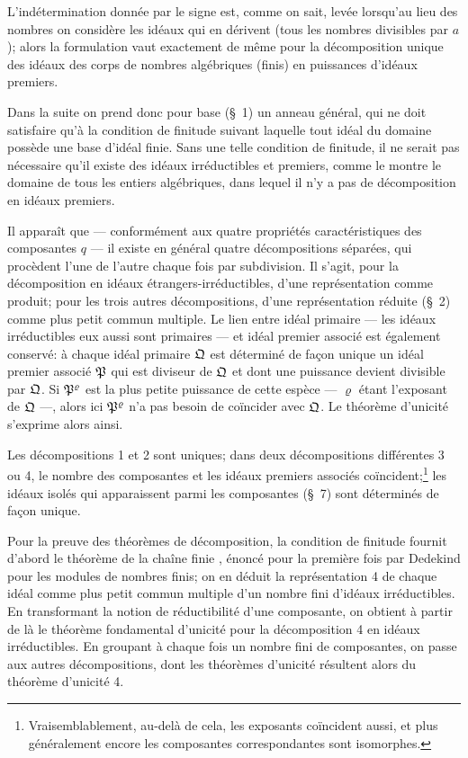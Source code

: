 L'indétermination donnée par le signe est, comme on sait, levée lorsqu'au lieu des nombres on considère les idéaux qui en dérivent (tous les nombres divisibles par $a$); alors la formulation vaut exactement de même pour la décomposition unique des idéaux des corps de nombres algébriques (finis) en puissances d'idéaux premiers.

Dans la suite on prend donc pour base (\S{}~1) un anneau général, qui ne doit satisfaire qu'à la condition de finitude suivant laquelle tout idéal du domaine possède une base d'idéal finie. Sans une telle condition de finitude, il ne serait pas nécessaire qu'il existe des idéaux irréductibles et premiers, comme le montre le domaine de tous les entiers algébriques, dans lequel il n'y a pas de décomposition en idéaux premiers.

Il apparaît que --- conformément aux quatre propriétés caractéristiques des composantes $q$ --- il existe en général quatre décompositions séparées, qui procèdent l'une de l'autre chaque fois par subdivision. Il s'agit, pour la décomposition en idéaux étrangers-irréductibles, d'une représentation comme produit; pour les trois autres décompositions, d'une représentation réduite (\S{}~2) comme plus petit commun multiple. Le lien entre idéal primaire --- les idéaux irréductibles eux aussi sont primaires --- et idéal premier associé est également conservé: à chaque idéal primaire $\mathfrak{Q}$ est déterminé de façon unique un idéal premier associé $\mathfrak{P}$ qui est diviseur de $\mathfrak{Q}$ et dont une puissance devient divisible par $\mathfrak{Q}$. Si $\mathfrak{P}^{\varrho}$ est la plus petite puissance de cette espèce --- $\varrho$ étant l'exposant de $\mathfrak{Q}$ ---, alors ici $\mathfrak{P}^{\varrho}$ n'a pas besoin de coïncider avec $\mathfrak{Q}$. Le théorème d'unicité s'exprime alors ainsi.

Les décompositions 1 et 2 sont uniques; dans deux décompositions différentes 3 ou 4, le nombre des composantes et les idéaux premiers associés coïncident;\footnote{Vraisemblablement, au-delà de cela, les exposants coïncident aussi, et plus généralement encore les composantes correspondantes sont isomorphes.} les idéaux isolés qui apparaissent parmi les composantes (\S{}~7) sont déterminés de façon unique.

Pour la preuve des théorèmes de décomposition, la condition de finitude fournit d'abord le \og{} théorème de la chaîne finie \fg{}, énoncé pour la première fois par Dedekind pour les modules de nombres finis; on en déduit la représentation 4 de chaque idéal comme plus petit commun multiple d'un nombre fini d'idéaux irréductibles. En transformant la notion de réductibilité d'une composante, on obtient à partir de là le théorème fondamental d'unicité pour la décomposition 4 en idéaux irréductibles. En groupant à chaque fois un nombre fini de composantes, on passe aux autres décompositions, dont les théorèmes d'unicité résultent alors du théorème d'unicité 4.


